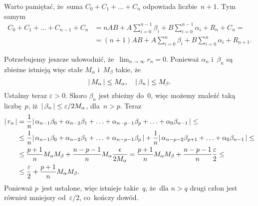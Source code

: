 \documentclass[a4paper,11pt]{article}
\begin{document}
Warto pamiętać, że~suma $C_{ 0 } + C_{ 1 } + \ldots + C_{ n }$ odpowiada
liczbie~$n + 1$. Tym samym
\begin{equation}
  \label{eq:Leja-27}
  \begin{split}
    C_{ 0 } + C_{ 1 } + \ldots + C_{ n - 1 } + C_{ n }
    &= n AB + A \sum_{ i = 0 }^{ n - 1 } \beta_{ i } + B \sum_{ i = 0 }^{ n - 1 }
      \alpha_{ i } + R_{ n } + C_{ n } = \\
    &= ( n + 1 ) AB + A \sum_{ i = 0 }^{ n } \beta_{ i } + B \sum_{ i = 0 }^{ n } \alpha_{ i }
      + R_{ n + 1 }.
  \end{split}
\end{equation}

\vspace{\spaceFour}



\start {} Potrzebujemy jeszcze udowodnić,
że~$\lim_{ n \to \infty } r_{ n } = 0$. Ponieważ $\alpha_{ n }$
i~$\beta_{ n }$ są zbieżne istnieją więc stałe $M_{ \alpha }$
i~$M_{ \beta }$ takie, że
\begin{equation}
  \label{eq:Leja-28}
    |\, {  M_{ \alpha }  } \,| \leq M_{ \alpha }, \quad |\, {  \beta_{ n }  } \,| \leq M_{ \beta }.
\end{equation}
Ustalmy teraz $\varepsilon > 0$. Skoro $\beta_{ n }$ jest zbieżny do~0,
więc możemy znaleźć taką liczbę~$p$,
iż~$|\, {  \beta_{ n }  } \,| \leq \varepsilon / 2 M_{ \alpha }$, dla~$n > p$.
Teraz
\begin{equation}
  \label{eq:Leja-29}
  \begin{split}
    |\, {  r_{ n }  } \,|
    &=
      \frac{ 1 }{ n } |\, {  \alpha_{ n - 1 } \beta_{ 0 } + \alpha_{ n - 2 } \beta_{ 1 }
      + \ldots + \alpha_{ n - p - 1 } \beta_{ p } + \ldots + \alpha_{ 0 } \beta_{ n - 1 }  } \,| \leq \\
    &\leq \frac{ 1 }{ n } |\, {  \alpha_{ n - 1 } \beta_{ 0 } + \alpha_{ n - 2 } \beta_{ 1 }
      + \ldots + \alpha_{ n - p - 1 } \beta_{ p }  } \,| + \frac{ 1 }{ n }
    |\, {  \alpha_{ n - p - 2 } \beta_{ p + 1 } + \ldots + \alpha_{ 0 } \beta_{ n - 1 }  } \,| \leq \\
    &\leq \frac{ p + 1 }{ n } M_{ \alpha } M_{ \beta }
      + \frac{ n - p - 1 }{ n } M_{ \alpha } \frac{ \epsilon }{ 2 M_{ \alpha } }
      = \frac{ p + 1 }{ n } M_{ \alpha } M_{ \beta } + \frac{ n - p - 1 }{ n }
    \frac{ \varepsilon }{ 2 } \leq \\
    &\leq \frac{ \varepsilon }{ 2 } + \frac{ p + 1 }{ n } M_{ \alpha } M_{ \beta }.
  \end{split}
\end{equation}
Ponieważ $p$~jest ustalone, więc istnieje takie~$q$, że~dla $n > q$
drugi człon jest również mniejszy od~$\varepsilon / 2$, co~kończy dowód.
\end{document}
